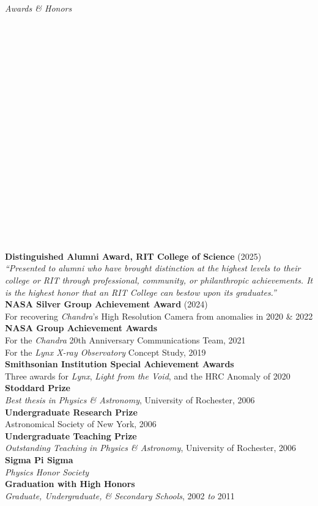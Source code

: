 \documentclass[11pt]{article}
\begin{document}
\vspace{4mm}

\hspace{2.5mm} \parbox{1.5in}{\textit{Awards \& Honors \\\\\\\\\\\\\\\\\\\\\\\\\\\\\\\\\\\\\\\\}} \parbox{5.15in}{
\textbf{Distinguished Alumni Award, RIT College of Science} (2025)\\
\textit{``Presented to alumni who have brought distinction at the highest levels to their college or RIT through professional, community, or philanthropic achievements. It is the highest honor that an RIT College can bestow upon its graduates.''}\\
\textbf{NASA Silver Group Achievement Award} (2024)\\
For recovering \textit{Chandra}'s High Resolution Camera from anomalies in 2020 \& 2022
\textbf{NASA Group Achievement Awards} \\
For the \textit{Chandra} 20th Anniversary Communications Team, 2021\\
For the \textit{Lynx X-ray Observatory} Concept Study, 2019\\
\textbf{Smithsonian Institution Special Achievement Awards} \\ Three awards for \textit{Lynx}, \textit{Light from the Void}, and the HRC Anomaly of 2020\\
\textbf{Stoddard Prize} \\ \textit{Best thesis in Physics \& Astronomy}, University of Rochester, 2006 \\
\textbf{Undergraduate Research Prize} \\ Astronomical Society of New York, 2006 \\
\textbf{Undergraduate Teaching Prize} \\ \textit{Outstanding Teaching in Physics \& Astronomy}, University of Rochester, 2006\\
\textbf{Sigma Pi Sigma} \\ \textit{Physics Honor Society} \\
\textbf{Graduation with High Honors} \\ \textit{Graduate, Undergraduate, \& Secondary Schools}, 2002 \textit{to} 2011
} \\
\end{document}
